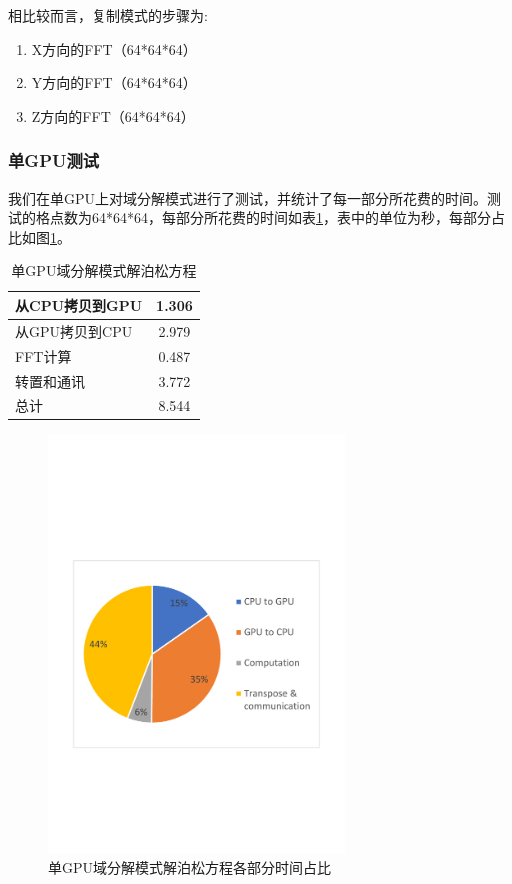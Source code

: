 相比较而言，复制模式的步骤为:
\begin{enumerate}
  \item X方向的FFT（64*64*64）
  \item Y方向的FFT（64*64*64）
  \item Z方向的FFT（64*64*64）
\end{enumerate}
\subsubsection{单GPU测试}
我们在单GPU上对域分解模式进行了测试，并统计了每一部分所花费的时间。测试的格点数为64*64*64，每部分所花费的时间如表\ref{tab:1GPU_Poisson}，表中的单位为秒，每部分占比如图\ref{fig:1GPU_Poisson}。

\begin{table}[!htbp]
    \centering
    \footnotesize%
    \setlength{\tabcolsep}{4pt}%
    \renewcommand{\arraystretch}{1.2}%
    \begin{tabular}{lc}
        \hline\hline
        从CPU拷贝到GPU    & 1.306     \\
        \hline
        从GPU拷贝到CPU    & 2.979     \\
        \hline
        FFT计算           & 0.487     \\
        \hline
        转置和通讯        & 3.772     \\
        \hline
        总计              & 8.544    \\
        \hline\hline
    \end{tabular}
    \caption{单GPU域分解模式解泊松方程}
    \label{tab:1GPU_Poisson}
\end{table}

\begin{figure}[!htb]
    \centering
    \includegraphics[width=0.7\textwidth]{Img/domain_decomposition_1GPU.pdf}
    \caption{单GPU域分解模式解泊松方程各部分时间占比}\label{fig:1GPU_Poisson}
\end{figure}

